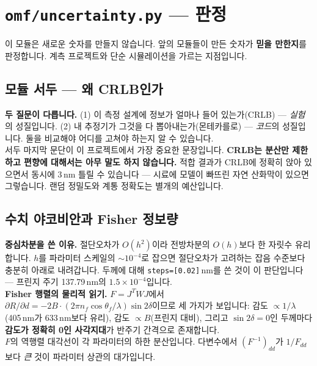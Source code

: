 \documentclass[10pt,a4paper]{article}
\newcommand{\note}[1]{%
  \begin{tcolorbox}[enhanced,breakable,colback=white,colframe=accent,
    boxrule=0pt,leftrule=1.6pt,arc=0pt,outer arc=0pt,
    left=6pt,right=2pt,top=3pt,bottom=3pt,boxsep=0pt,
    before skip=5pt, after skip=8pt]
  #1
  \end{tcolorbox}}
\begin{document}
\section{\texttt{omf/uncertainty.py} — 판정}

이 모듈은 새로운 숫자를 만들지 않습니다. 앞의 모듈들이 만든 숫자가 \textbf{믿을 만한지}를
판정합니다. 계측 프로젝트와 단순 시뮬레이션을 가르는 지점입니다.

\subsection{모듈 서두 — 왜 CRLB인가}

\note{
\textbf{두 질문이 다릅니다.} (1) 이 측정 설계에 정보가 얼마나 들어 있는가(CRLB) —
\emph{실험}의 성질입니다. (2) 내 추정기가 그것을 다 뽑아내는가(몬테카를로) —
\emph{코드}의 성질입니다. 둘을 비교해야 어디를 고쳐야 하는지 알 수 있습니다.\\[4pt]
서두 마지막 문단이 이 프로젝트에서 가장 중요한 문장입니다.
\textbf{CRLB는 분산만 제한하고 편향에 대해서는 아무 말도 하지 않습니다.}
적합 결과가 CRLB에 정확히 앉아 있으면서 동시에 3\,nm 틀릴 수 있습니다 —
시료에 모델이 빠뜨린 자연 산화막이 있으면 그렇습니다.
랜덤 정밀도와 계통 정확도는 별개의 예산입니다.
}
\subsection{수치 야코비안과 Fisher 정보량}

\note{
\textbf{중심차분을 쓴 이유.} 절단오차가 $O(h^2)$이라 전방차분의 $O(h)$보다 한 자릿수
유리합니다. $h$를 파라미터 스케일의 $\sim10^{-4}$로 잡으면 절단오차가 고려하는
잡음 수준보다 충분히 아래로 내려갑니다. 두께에 대해 \texttt{steps=[0.02]}\,nm를 쓴 것이
이 판단입니다 — 프린지 주기 137.79\,nm의 $1.5\times10^{-4}$입니다.\\[4pt]
\textbf{Fisher 행렬의 물리적 읽기.} $F=J^TWJ$에서
$\partial R/\partial d = -2B\cdot(2\pi n_f\cos\theta_f/\lambda)\sin2\delta$이므로 세 가지가 보입니다:
감도 $\propto1/\lambda$(405\,nm가 633\,nm보다 유리),
감도 $\propto B$(프린지 대비),
그리고 $\sin2\delta=0$인 두께마다 \textbf{감도가 정확히 0인 사각지대}가 반주기 간격으로 존재합니다.\\[4pt]
$F$의 역행렬 대각선이 각 파라미터의 하한 분산입니다. 다변수에서 $(F^{-1})_{dd}$가
$1/F_{dd}$보다 \emph{큰} 것이 파라미터 상관의 대가입니다.
}
\end{document}
